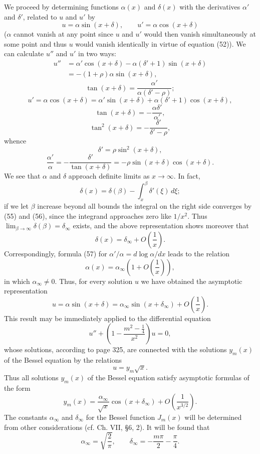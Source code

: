 We proceed by determining functions $\alpha(x)$ and $\delta(x)$ with the derivatives $\alpha'$ and $\delta'$, related to $u$ and $u'$ by
\[
u=\alpha\sin(x+\delta),\qquad u'=\alpha\cos(x+\delta)
\]
($\alpha$ cannot vanish at any point since $u$ and $u'$ would then vanish simultaneously at some point and thus $u$ would vanish identically in virtue of equation (52)). We can calculate $u''$ and $u'$ in two ways:
\[
\begin{aligned}
u''&=\alpha'\cos(x+\delta)-\alpha(\delta'+1)\sin(x+\delta)\\
&=-(1+\rho)\alpha\sin(x+\delta),
\end{aligned}
\]
\[
\tan(x+\delta)=\frac{\alpha'}{\alpha(\delta'-\rho)};
\]
\[
u'=\alpha\cos(x+\delta)=\alpha'\sin(x+\delta)+\alpha(\delta'+1)\cos(x+\delta),
\]
\[
\tan(x+\delta)=-\frac{\alpha\delta'}{\alpha'},
\]
\[
\tan^2(x+\delta)=-\frac{\delta'}{\delta'-\rho},
\]
whence
\begin{equation}
\delta'=\rho\sin^2(x+\delta),
\tag{56}
\end{equation}
\begin{equation}
\frac{\alpha'}{\alpha}=-\frac{\delta'}{\tan(x+\delta)}=-\rho\sin(x+\delta)\cos(x+\delta).
\tag{57}
\end{equation}
We see that $\alpha$ and $\delta$ approach definite limits as $x\to\infty$. In fact,
\[
\delta(x)=\delta(\beta)-\int_x^\beta\delta'(\xi)\,d\xi;
\]
if we let $\beta$ increase beyond all bounds the integral on the right side converges by (55) and (56), since the integrand approaches zero like $1/x^2$. Thus $\lim_{\beta\to\infty}\delta(\beta)=\delta_\infty$ exists, and the above representation shows moreover that
\[
\delta(x)=\delta_\infty+O\left(\frac1x\right).
\]
Correspondingly, formula (57) for $\alpha'/\alpha=d\log\alpha/dx$ leads to the relation
\[
\alpha(x)=\alpha_\infty\left(1+O\left(\frac1x\right)\right),
\]
in which $\alpha_\infty\ne0$. Thus, for every solution $u$ we have obtained the asymptotic representation
\[
u=\alpha\sin(x+\delta)=\alpha_\infty\sin(x+\delta_\infty)+O\left(\frac1x\right).
\]
This result may be immediately applied to the differential equation
\[
u''+\left(1-\frac{m^2-\frac14}{x^2}\right)u=0,
\]
whose solutions, according to page 325, are connected with the solutions $y_m(x)$ of the Bessel equation by the relations
\[
u=y_m\sqrt{x}.
\]
Thus all solutions $y_m(x)$ of the Bessel equation satisfy asymptotic formulas of the form
\[
y_m(x)=\frac{\alpha_\infty}{\sqrt{x}}\cos(x+\delta_\infty)+O\left(\frac1{x^{3/2}}\right).
\]
The constants $\alpha_\infty$ and $\delta_\infty$ for the Bessel function $J_m(x)$ will be determined from other considerations (cf. Ch. VII, \S6, 2). It will be found that
\[
\alpha_\infty=\sqrt{\frac2\pi},\qquad \delta_\infty=-\frac{m\pi}{2}-\frac\pi4.
\]

